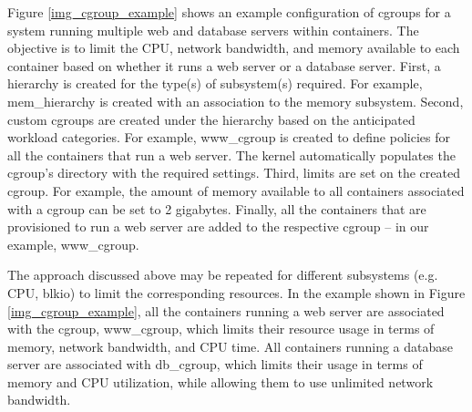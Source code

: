 Figure \ref{img_cgroup_example} shows an example configuration of cgroups for a system running multiple web and database servers within containers. The objective is to limit the CPU, network bandwidth, and memory available to each container based on whether it runs a web server or a database server. First, a hierarchy is created for the type(s) of subsystem(s) required. For example, mem\_hierarchy is created with an association to the memory subsystem. Second, custom cgroups are created under the hierarchy based on the anticipated workload categories. For example, www\_cgroup is created to define policies for all the containers that run a web server. The kernel automatically populates the cgroup’s directory with the required settings. Third, limits are set on the created cgroup. For example, the amount of memory available to all containers associated with a cgroup can be set to 2 gigabytes. Finally, all the containers that are provisioned to run a web server are added to the respective cgroup -- in our example, www\_cgroup. 

The approach discussed above may be repeated for different subsystems (e.g. CPU, blkio) to limit the corresponding resources. In the example shown in Figure \ref{img_cgroup_example}, all the containers running a web server are associated with the cgroup, www\_cgroup, which limits their resource usage in terms of memory, network bandwidth, and CPU time. All containers running a database server are associated with db\_cgroup, which limits their usage in terms of memory and CPU utilization, while allowing them to use unlimited network bandwidth. 






